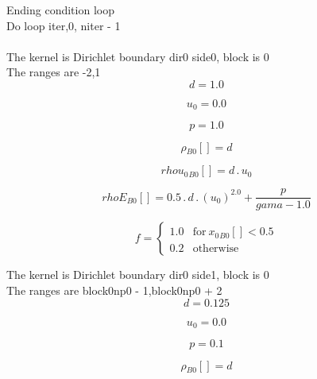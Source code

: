\documentclass{article}
\begin{document}
\noindent Ending condition loop %
\\\noindent Do loop iter,0, niter - 1\\
\\\noindent The kernel is Dirichlet boundary dir0 side0, block is 0\\\noindent The ranges are -2,1\\\begin{dmath}d = 1.0\end{dmath}

\begin{dmath}u_{0} = 0.0\end{dmath}

\begin{dmath}p = 1.0\end{dmath}

\begin{dmath}{\rho{_{B0}}}[{}] = d\end{dmath}

\begin{dmath}{rhou_{0}{_{B0}}}[{}] = d \,.\, u_{0}\end{dmath}

\begin{dmath}{rhoE{_{B0}}}[{}] = 0.5 \,.\, d \,.\, \left(u_{0} \right)^{2.0} + \frac{p}{gama - 1.0}\end{dmath}

\begin{dmath}f = \begin{cases} 1.0 & \text{for}\: {x_{0}{_{B0}}}[{}] < 0.5 \\0.2 & \text{otherwise} \end{cases}\end{dmath}

\noindent The kernel is Dirichlet boundary dir0 side1, block is 0\\\noindent The ranges are block0np0 - 1,block0np0 + 2\\\begin{dmath}d = 0.125\end{dmath}

\begin{dmath}u_{0} = 0.0\end{dmath}

\begin{dmath}p = 0.1\end{dmath}

\begin{dmath}{\rho{_{B0}}}[{}] = d\end{dmath}
\end{document}
